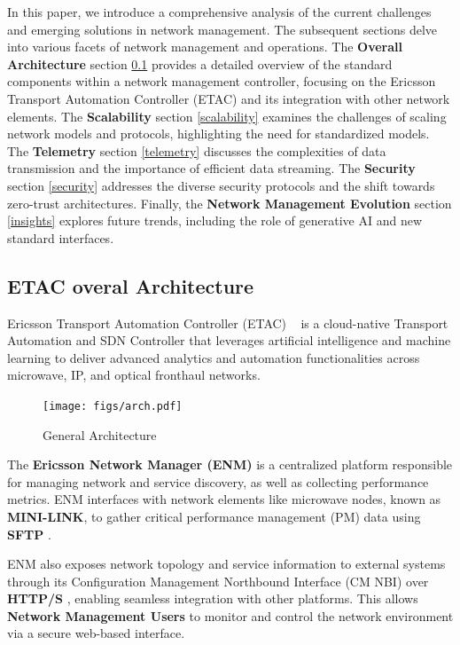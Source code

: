 \documentclass[11pt,sigconf]{iabart}
\begin{document}
In this paper, we introduce a comprehensive analysis of the current challenges and emerging solutions in network management. The subsequent sections delve into various facets of network management and operations. The \textbf{Overall Architecture} section \ref{overview} provides a detailed overview of the standard components within a network management controller, focusing on the Ericsson Transport Automation Controller (ETAC) and its integration with other network elements. The \textbf{Scalability} section \ref{scalability} examines the challenges of scaling network models and protocols, highlighting the need for standardized models. The \textbf{Telemetry} section \ref{telemetry} discusses the complexities of data transmission and the importance of efficient data streaming. The \textbf{Security} section \ref{security} addresses the diverse security protocols and the shift towards zero-trust architectures. Finally, the \textbf{Network Management Evolution} section \ref{insights} explores future trends, including the role of generative AI and new standard interfaces.

\subsection{ETAC overal Architecture} \label{overview}

Ericsson Transport Automation Controller (ETAC) ~\cite{ericsson-etac} is a cloud-native Transport Automation and SDN Controller that leverages artificial intelligence and machine learning to deliver advanced analytics and automation functionalities across microwave, IP, and optical fronthaul networks.

\begin{figure}[h]
  \centering
  \texttt{[image: figs/arch.pdf]}
  \caption{General Architecture}
  \label{fig:overall_architecture}
\end{figure}


The \textbf{Ericsson Network Manager (ENM)} is a centralized platform responsible for managing network and service discovery, as well as collecting performance metrics. ENM interfaces with network elements like microwave nodes, known as \textbf{MINI-LINK}, to gather critical performance management (PM) data using \textbf{SFTP} \cite{RFC4253}.

ENM also exposes network topology and service information to external systems through its Configuration Management Northbound Interface (CM NBI) over \textbf{HTTP/S} \cite{RFC7230}, enabling seamless integration with other platforms. This allows \textbf{Network Management Users} to monitor and control the network environment via a secure web-based interface.
\end{document}
